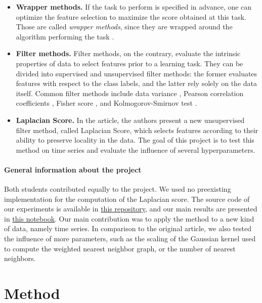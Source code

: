 \documentclass[11pt]{article}
\begin{document}
\begin{itemize}
    \item \textbf{Wrapper methods.} If the task to perform is specified in advance, one can optimize the feature selection to maximize the score obtained at this task. Those are called \emph{wrapper methods}, since they are wrapped around the algorithm performing the task \cite{kohavi_wrappers_1997}. 
    \item \textbf{Filter methods.} Filter methods, on the contrary, evaluate the intrinsic properties of data to select features prior to a learning task. They can be divided into supervised and unsupervised filter methods: the former evaluates features with respect to the class labels, and the latter rely solely on the data itself. Common filter methods include data variance \cite{munson_feature_2009}, Pearson correlation coefficients \cite{freedman_statistics_2007}, Fisher score \cite{gu_generalized_2012}, and Kolmogorov-Smirnov test \cite{darling_kolmogorov-smirnov_1957}.
    \item \textbf{Laplacian Score.} In the article, the authors present a new unsupervised filter method, called Laplacian Score, which selects features according to their ability to preserve locality in the data. The goal of this project is to test this method on time series and evaluate the influence of several hyperparameters. 
\end{itemize}


\paragraph{General information about the project} Both students contributed equally to the project. We used no preexisting implementation for the computation of the Laplacian score. The source code of our experiments is available in \href{https://github.com/decarpentierg/laplacian-score-4-time-series}{this repository}, and our main results are presented in \href{https://github.com/decarpentierg/laplacian-score-4-time-series/blob/main/doc/evaluate_laplacian_score.ipynb}{this notebook}. Our main contribution was to apply the method to a new kind of data, namely time series. In comparison to the original article, we also tested the influence of more parameters, such as the scaling of the Gaussian kernel used to compute the weighted nearest neighbor graph, or the number of nearest neighbors.

\newpage
\section{Method} \label{sec:method}
\end{document}

